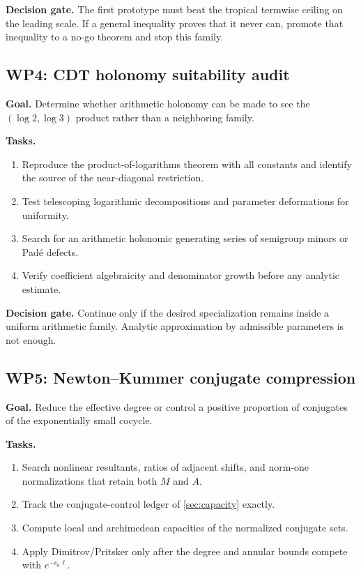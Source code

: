 \documentclass[10pt,letterpaper]{article}
\begin{document}
\textbf{Decision gate.}  The first prototype must beat the tropical termwise ceiling on the
leading scale.  If a general inequality proves that it never can, promote that inequality to
a no-go theorem and stop this family.

\subsection{WP4: CDT holonomy suitability audit}

\textbf{Goal.}  Determine whether arithmetic holonomy can be made to see the
\((\log2,\log3)\) product rather than a neighboring family.

\textbf{Tasks.}
\begin{enumerate}
\item Reproduce the product-of-logarithms theorem with all constants and identify the source
of the near-diagonal restriction.
\item Test telescoping logarithmic decompositions and parameter deformations for uniformity.
\item Search for an arithmetic holonomic generating series of semigroup minors or Pad\'e
defects.
\item Verify coefficient algebraicity and denominator growth before any analytic estimate.
\end{enumerate}

\textbf{Decision gate.}  Continue only if the desired specialization remains inside a
uniform arithmetic family.  Analytic approximation by admissible parameters is not enough.

\subsection{WP5: Newton--Kummer conjugate compression}

\textbf{Goal.}  Reduce the effective degree or control a positive proportion of conjugates of
the exponentially small cocycle.

\textbf{Tasks.}
\begin{enumerate}
\item Search nonlinear resultants, ratios of adjacent shifts, and norm-one normalizations
that retain both \(M\) and \(A\).
\item Track the conjugate-control ledger of \cref{sec:capacity} exactly.
\item Compute local and archimedean capacities of the normalized conjugate sets.
\item Apply Dimitrov/Pritsker only after the degree and annular bounds compete with
\(e^{-c_0\ell}\).
\end{enumerate}
\end{document}
